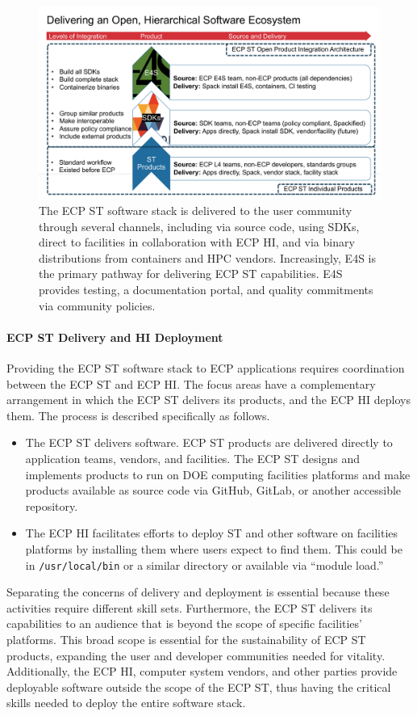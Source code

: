 \begin{figure}
	\centering
	\includegraphics[width=1.0\linewidth]{E4S-Hierarchy}
	\caption{The ECP ST software stack is delivered to the user community through several channels, including via source code, using SDKs, direct to facilities in collaboration with ECP HI, and via binary distributions from containers and HPC vendors.
	Increasingly, E4S is the primary pathway for delivering ECP ST capabilities.  E4S provides testing, a documentation portal, and quality commitments via community policies.}
	\label{fig:hierarchy}
\end{figure}


\paragraph{ECP ST Delivery and HI Deployment}
Providing the ECP ST software stack to ECP applications requires coordination between the ECP ST and ECP HI. The focus areas have a complementary arrangement in which the ECP ST delivers its products, and the ECP HI deploys them. The process is described specifically as follows.
\begin{itemize}
	\item The ECP ST delivers software.  ECP ST products are delivered directly to application teams, vendors, and facilities.  The ECP ST designs and implements products to run on DOE computing facilities platforms and make products available as source code via GitHub, GitLab, or another accessible repository.
	\item The ECP HI facilitates efforts to deploy ST and other software on facilities platforms by installing them where users expect to find them. This could be in \texttt{/usr/local/bin} or a similar directory or available via ``module load.''
\end{itemize}
Separating the concerns of delivery and deployment is essential because these activities require different skill sets. Furthermore, the ECP ST delivers its capabilities to an audience that is beyond the scope of specific facilities’ platforms. This broad scope is essential for the sustainability of ECP ST products, expanding the user and developer communities needed for vitality. Additionally, the ECP HI, computer system vendors, and other parties provide deployable software outside the scope of the ECP ST, thus having the critical skills needed to deploy the entire software stack.

